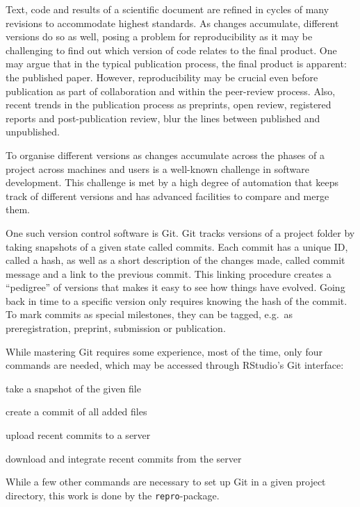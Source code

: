 \documentclass[12pt,a4paper,]{article}
\providecommand{\tightlist}{%
  \setlength{\itemsep}{0pt}\setlength{\parskip}{0pt}}
\begin{document}
Text, code and results of a scientific document are refined in cycles of many revisions to accommodate highest standards.
As changes accumulate, different versions do so as well, posing a problem for reproducibility as it may be challenging to find out which version of code relates to the final product.
One may argue that in the typical publication process, the final product is apparent: the published paper.
However, reproducibility may be crucial even before publication as part of collaboration and within the peer-review process.
Also, recent trends in the publication process as preprints, open review, registered reports and post-publication review, blur the lines between published and unpublished.

To organise different versions as changes accumulate across the phases of a project across machines and users is a well-known challenge in software development.
This challenge is met by a high degree of automation that keeps track of different versions and has advanced facilities to compare and merge them.

One such version control software is Git. Git tracks versions of a project folder by taking snapshots of a given state called commits.
Each commit has a unique ID, called a hash, as well as a short description of the changes made, called commit message and a link to the previous commit.
This linking procedure creates a ``pedigree'' of versions that makes it easy to see how things have evolved.
Going back in time to a specific version only requires knowing the hash of the commit.
To mark commits as special milestones, they can be tagged, e.g.~as preregistration, preprint, submission or publication.

While mastering Git requires some experience, most of the time, only four commands are needed, which may be accessed through RStudio's Git interface:

\begin{description}
\tightlist
\item[git add]
take a snapshot of the given file
\item[git commit]
create a commit of all added files
\item[git push]
upload recent commits to a server
\item[git pull]
download and integrate recent commits from the server
\end{description}

While a few other commands are necessary to set up Git in a given project directory, this work is done by the \texttt{repro}-package.
\end{document}
